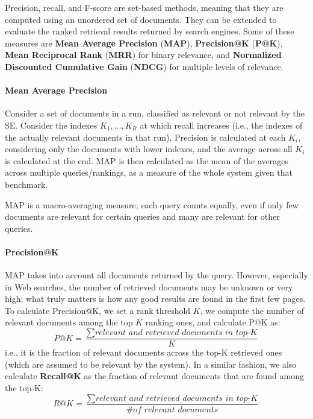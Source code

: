 Precision, recall, and F-score are set-based methods, meaning that they are computed using an unordered set of documents. They can be extended to evaluate the ranked retrieval results returned by search engines. Some of these measures are \textbf{Mean Average Precision} (\textbf{MAP}), \textbf{Precision@K} (\textbf{P@K}), \textbf{Mean Reciprocal Rank} (\textbf{MRR}) for binary relevance, and \textbf{Normalized Discounted Cumulative Gain} (\textbf{NDCG}) for multiple levels of relevance.

\paragraph{Mean Average Precision}

Consider a set of documents in a run, classified as relevant or not relevant by the SE. Consider the indexes $K_1, \dots, K_R$ at which recall increases (i.e., the indexes of the actually relevant documents in that run). Precision is calculated at each $K_i$, considering only the documents with lower indexes, and the average across all $K_i$ is calculated at the end. MAP is then calculated as the mean of the averages across multiple queries/rankings, as a measure of the whole system given that benchmark.

MAP is a macro-averaging measure; each query counts equally, even if only few documents are relevant for certain queries and many are relevant for other queries.

\paragraph{Precision@K}

MAP takes into account all documents returned by the query. However, especially in Web searches, the number of retrieved documents may be unknown or very high; what truly matters is how any good results are found in the first few pages. To calculate Precision@K, we set a rank threshold $K$, we compute the number of relevant documents among the top $K$ ranking ones, and calculate P@K as:
\begin{equation*}
    P@K = \frac{\sum \textit{relevant and retrieved documents in top-K}}{K}
\end{equation*}
i.e., it is the fraction of relevant documents across the top-K retrieved ones (which are assumed to be relevant by the system). In a similar fashion, we also calculate \textbf{Recall@K} as the fraction of relevant documents that are found among the top-K:
\begin{equation*}
    R@K = \frac{\sum \textit{relevant and retrieved documents in top-K}}{\textit{\# of relevant documents}}
\end{equation*}

